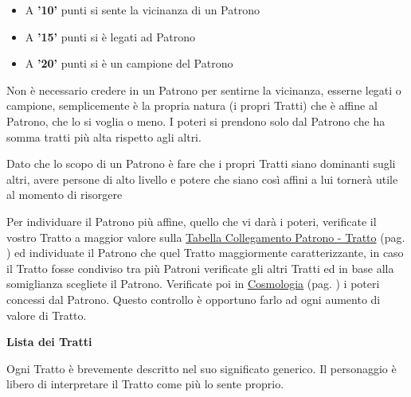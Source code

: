 \documentclass[a4paper,twoside,openany]{book}
\begin{document}
\begin{multicols}{2}
\begin{itemize}[leftmargin=*]
		\item A \textbf{'10'} punti si sente la vicinanza di un Patrono

		\item A \textbf{'15'} punti si è legati ad Patrono

		\item A \textbf{'20'} punti si è un campione del Patrono
	\end{itemize}

	Non è necessario credere in un Patrono per sentirne la vicinanza, esserne legati o campione, semplicemente è la propria natura (i propri Tratti) che è affine al Patrono, che lo si voglia o meno. I poteri si prendono solo dal Patrono che ha somma tratti più alta rispetto agli altri.

	Dato che lo scopo di un Patrono è fare che i propri Tratti siano dominanti sugli altri, avere persone di alto livello e potere che siano così affini a lui tornerà utile al momento di risorgere

	Per individuare il Patrono più affine, quello che vi darà i poteri, verificate il vostro Tratto a maggior valore sulla \hyperlink{tabellacollegamentopatronotratto}{Tabella Collegamento Patrono - Tratto} (pag. \pageref{tabellacollegamentopatronotratto}) ed individuate il Patrono che quel Tratto maggiormente caratterizzante, in caso il Tratto fosse condiviso tra più Patroni verificate gli altri Tratti ed in base alla somiglianza scegliete il Patrono.
	Verificate poi in \hyperlink{cosmologia}{Cosmologia} (pag. \pageref{patroni}) i poteri concessi dal Patrono. Questo controllo è opportuno farlo ad ogni aumento di valore di Tratto.

	\medskip

	\textbf{Lista dei Tratti}

	Ogni Tratto è brevemente descritto nel suo significato generico. Il personaggio è libero di interpretare il Tratto come più lo sente proprio.

	\medskip


\end{multicols}
\end{document}
